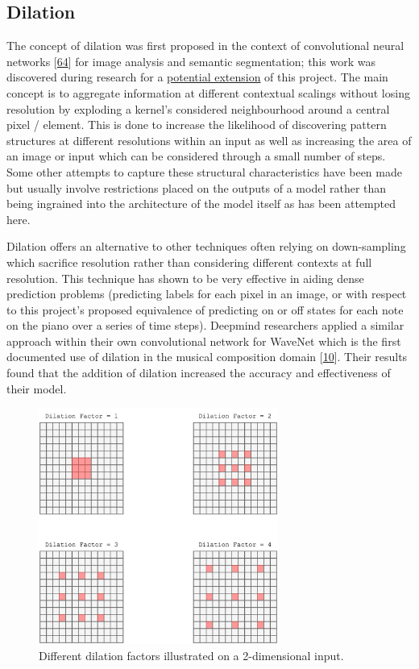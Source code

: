 \documentclass[12pt,]{article}
\begin{document}
\hypertarget{dilation}{%
\subsection{Dilation}\label{dilation}}

The concept of dilation was first proposed in the context of
convolutional neural networks
{[}\protect\hyperlink{ref-yu2015multi}{64}{]} for image analysis and
semantic segmentation; this work was discovered during research for a
\protect\hyperlink{sentimentalinputfromimages}{potential extension} of
this project. The main concept is to aggregate information at different
contextual scalings without losing resolution by exploding a kernel's
considered neighbourhood around a central pixel / element. This is done
to increase the likelihood of discovering pattern structures at
different resolutions within an input as well as increasing the area of
an image or input which can be considered through a small number of
steps. Some other attempts to capture these structural characteristics
have been made but usually involve restrictions placed on the outputs of
a model rather than being ingrained into the architecture of the model
itself as has been attempted here.

Dilation offers an alternative to other techniques often relying on
down-sampling which sacrifice resolution rather than considering
different contexts at full resolution. This technique has shown to be
very effective in aiding dense prediction problems (predicting labels
for each pixel in an image, or with respect to this project's proposed
equivalence of predicting on or off states for each note on the piano
over a series of time steps). Deepmind researchers applied a similar
approach within their own convolutional network for WaveNet which is the
first documented use of dilation in the musical composition domain
{[}\protect\hyperlink{ref-oord2016wavenet}{10}{]}. Their results found
that the addition of dilation increased the accuracy and effectiveness
of their model.

\begin{figure}
\centering
\includegraphics[width=0.7\textwidth,height=\textheight]{Images/dilation2d.png}
\caption{Different dilation factors illustrated on a 2-dimensional
input.}
\end{figure}
\end{document}

